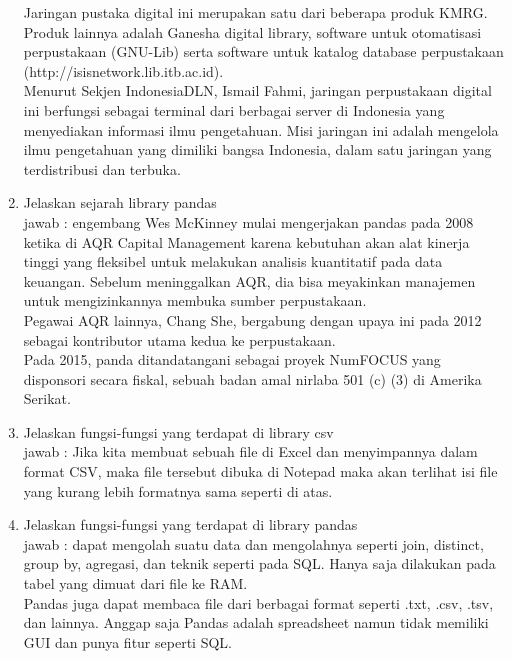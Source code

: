 \begin{enumerate}
Jaringan pustaka digital ini merupakan satu dari beberapa produk KMRG. Produk lainnya adalah Ganesha digital library, software untuk otomatisasi perpustakaan (GNU-Lib) serta software untuk katalog database perpustakaan\\
(http://isisnetwork.lib.itb.ac.id).\\

Menurut Sekjen IndonesiaDLN,  Ismail Fahmi, jaringan perpustakaan digital ini berfungsi sebagai terminal dari berbagai server di Indonesia yang menyediakan informasi ilmu pengetahuan. Misi jaringan ini adalah mengelola ilmu pengetahuan yang dimiliki bangsa Indonesia, dalam satu jaringan yang terdistribusi dan terbuka.\\

\item Jelaskan sejarah library pandas\\
jawab : engembang Wes McKinney mulai mengerjakan pandas pada 2008 ketika di AQR Capital Management karena kebutuhan akan alat kinerja tinggi yang fleksibel untuk melakukan analisis kuantitatif pada data keuangan. Sebelum meninggalkan AQR, dia bisa meyakinkan manajemen untuk mengizinkannya membuka sumber perpustakaan.\\

Pegawai AQR lainnya, Chang She, bergabung dengan upaya ini pada 2012 sebagai kontributor utama kedua ke perpustakaan.\\

Pada 2015, panda ditandatangani sebagai proyek NumFOCUS yang disponsori secara fiskal, sebuah badan amal nirlaba 501 (c) (3) di Amerika Serikat.\\

\item Jelaskan fungsi-fungsi yang terdapat di library csv\\
jawab : Jika kita membuat sebuah file di Excel dan menyimpannya dalam format CSV, maka file tersebut dibuka di Notepad maka akan terlihat isi file yang kurang lebih formatnya sama seperti di atas.\\

\item Jelaskan fungsi-fungsi yang terdapat di library pandas\\
jawab : dapat mengolah suatu data dan mengolahnya seperti join, distinct, group by, agregasi, dan teknik seperti pada SQL. Hanya saja dilakukan pada tabel yang dimuat dari file ke RAM.\\

Pandas juga dapat membaca file dari berbagai format seperti .txt, .csv, .tsv, dan lainnya. Anggap saja Pandas adalah spreadsheet namun tidak memiliki GUI dan punya fitur seperti SQL.\\
\end{enumerate}

